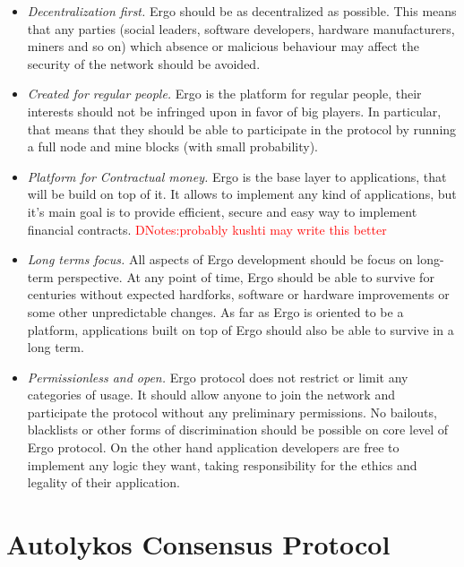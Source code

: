 \documentclass[]{article}
\newcommand{\dnote}[1]{{\textcolor{red}{DNotes:{#1}}}}
\newcommand{\Ergo}{Ergo}
\begin{document}
    \begin{itemize}
        \item{\em Decentralization first.} \Ergo{} should be as decentralized as possible.
        This means that any parties (social leaders, software developers, hardware manufacturers, miners and so on)
        which absence or malicious behaviour may affect the security of the network should be avoided.
        \item{\em Created for regular people.} \Ergo{} is the platform for regular people, their interests should
        not be infringed upon in favor of big players. In particular, that means that they should be able to
        participate in the protocol by running a full node and mine blocks (with small probability).
        \item{\em Platform for Contractual money.} \Ergo{} is the base layer to applications, that will be
        build on top of it. It allows to implement any kind of applications, but it's main goal is
        to provide efficient, secure and easy way to implement financial contracts. \dnote{probably kushti may write this better}
        \item{\em Long terms focus.} All aspects of \Ergo{} development should be focus on long-term perspective.
        At any point of time, \Ergo{} should be able to survive for centuries without expected hardforks,
        software or hardware improvements or some other unpredictable changes. As far as \Ergo{} is oriented
        to be a platform, applications built on top of \Ergo{} should also be able to survive in a long term.
        \item{\em Permissionless and open.} \Ergo{} protocol does not restrict or limit any categories of usage.
        It should allow anyone to join the network and participate the protocol without any preliminary permissions.
        No bailouts, blacklists or other forms of discrimination should be possible on core level of \Ergo{} protocol.
        On the other hand application developers are free to implement any logic they want, taking responsibility
        for the ethics and legality of their application.
    \end{itemize}


    \section{Autolykos Consensus Protocol}
    \label{sec:autolykos}

\end{document}
